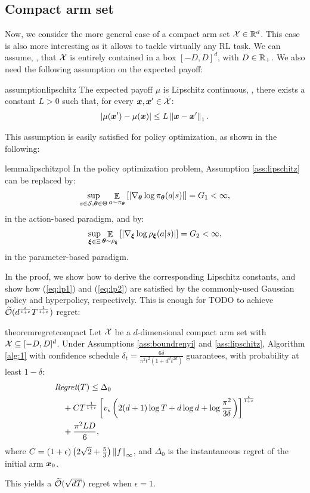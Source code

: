 \documentclass{article}
\makeatletter
\DeclareRobustCommand{\algoname}{TODO\@\xspace}
\makeatother
\begin{document}
\subsection{Compact arm set}
Now, we consider the more general case of a compact arm set $\Xspace\in\Reals^d$. This case is also more interesting as it allows to tackle virtually any RL task. We can assume, \wlg, that $\Xspace$ is entirely contained in a box $[-D,D]^d$, with $D\in\Reals_{+}$. We also need the following assumption on the expected payoff:
%
\begin{restatable}{assumption}{lipschitz}\label{ass:lipschitz}
	The expected payoff $\mu$ is Lipschitz continuous, \ie, there exists a constant $L>0$ such that, for every $\vx, \vx'\in\Xspace$:
	\begin{align*}
		|\mu(\vx') - \mu(\vx)| \leq L\norm[1]{\vx - \vx'}.
	\end{align*}
\end{restatable}
%
This assumption is easily satisfied for policy optimization, as shown in the following:
%
\begin{restatable}{lemma}{lipschitzpol}\label{lem:lispschitzpol}
	In the policy optimization problem, Assumption \ref{ass:lipschitz} can be replaced by:
	\begin{align}\label{eq:lp1}
		\sup_{s\in\Sspace,\vtheta\in\Theta}\Exp_{a\sim\pi_{\vtheta}}
		\left[\left|\nabla_{\vtheta}\log\pi_{\vtheta}(a|s)\right|\right] = G_1 < \infty,
	\end{align}
	in the action-based paradigm, and by:
	\begin{align}\label{eq:lp2}
		\sup_{\vxi\in\Xi}\Exp_{\vtheta\sim\rho_{\vxi}}
		\left[\left|\nabla_{\vxi}\log\rho_{\vxi}(a|s)\right|\right] = G_2 < \infty,
	\end{align}
	in the parameter-based paradigm.
\end{restatable}
%
In the proof, we show how to derive the corresponding Lipschitz constants, and show how (\ref{eq:lp1}) and (\ref{eq:lp2}) are satisfied by the commonly-used Gaussian policy and hyperpolicy, respectively. This is enough for \algoname to achieve $\wt{\mathcal{O}}(d^{\frac{\epsilon}{1+\epsilon}}T^{\frac{1}{1+\epsilon}})$ regret:
%
\begin{restatable}{theorem}{regretcompact}\label{th:regretcompact}
	Let $\Xspace$ be a $d$-dimensional compact arm set with $\Xspace \subseteq [-D,D]^d$. Under Assumptions \ref{ass:boundrenyi} and \ref{ass:lipschitz}, Algorithm \ref{alg:1} with confidence schedule $\delta_t = \frac{6\delta}{\pi^2t^2(1+d^dt^{2d})}$ guarantees, with probability at least $1-\delta$:
	\begin{align*}
	&\Reg(T) \leq \Delta_0 \\
	&\quad+ 	C
	T^{\frac{1}{1+\epsilon}}
	\left[v_{\epsilon}
	\left(2(d+1)\log T + d\log d + \log \frac{\pi^2}{3\delta}\right)
	\right]^{\frac{\epsilon}{1+\epsilon}} \\
	&\quad+ \frac{\pi^2LD}{6},
	\end{align*}
	where $C=(1+\epsilon)\left(2\sqrt{2}+\frac{5}{3}\right)\norm[\infty]{f}$, and $\Delta_0$ is the instantaneous regret of the initial arm $\vx_0$.
\end{restatable}
%
This yields a $\wt{\mathcal{O}}(\sqrt{dT})$ regret when $\epsilon=1$.
\end{document}

